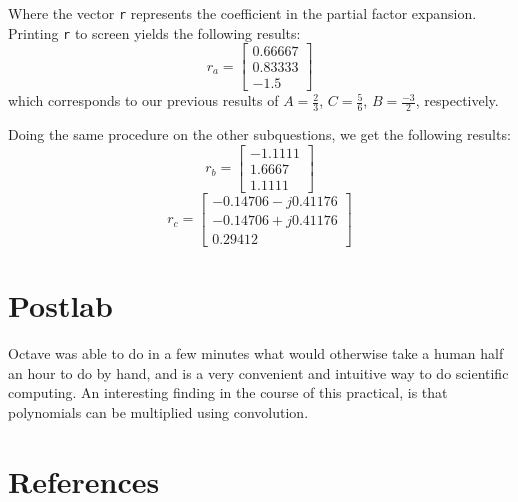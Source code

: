 \documentclass[12pt, a4paper]{article}
\begin{document}
			\noindent Where the vector \texttt{r} represents the coefficient in the partial factor expansion. Printing \texttt{r} to screen yields the following results:
			\[
				r_a =
				\begin{bmatrix}
					0.66667 \\
					0.83333 \\
					-1.5
				\end{bmatrix}
			\]
			which corresponds to our previous results of $A=\tfrac{2}{3}$, $C=\tfrac{5}{6}$, $B=\tfrac{-3}{2}$, respectively.

			Doing the same procedure on the other subquestions, we get the following results:
			\[
				r_b =
				\begin{bmatrix}
					-1.1111 \\
					1.6667 \\
					1.1111
				\end{bmatrix}
			\]
			\[
				r_c =
				\begin{bmatrix}
					-0.14706 - j0.41176 \\
					-0.14706 + j0.41176 \\
					0.29412
				\end{bmatrix}
			\]


	\section{Postlab} %
	\label{sec:postlab}
		Octave was able to do in a few minutes what would otherwise take a human half an hour to do by hand, and is a very convenient and intuitive way to do scientific computing. An interesting finding in the course of this practical, is that polynomials can be multiplied using convolution.

	\section{References} %
	\label{sec:references}
		
\end{document}
